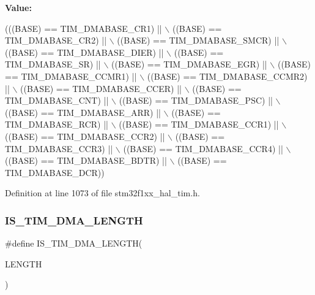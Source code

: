 {\bfseries Value\+:}
\begin{DoxyCode}
(((BASE) == TIM\_DMABASE\_CR1)   || \(\backslash\)
                               ((BASE) == TIM\_DMABASE\_CR2)   || \(\backslash\)
                               ((BASE) == TIM\_DMABASE\_SMCR)  || \(\backslash\)
                               ((BASE) == TIM\_DMABASE\_DIER)  || \(\backslash\)
                               ((BASE) == TIM\_DMABASE\_SR)    || \(\backslash\)
                               ((BASE) == TIM\_DMABASE\_EGR)   || \(\backslash\)
                               ((BASE) == TIM\_DMABASE\_CCMR1) || \(\backslash\)
                               ((BASE) == TIM\_DMABASE\_CCMR2) || \(\backslash\)
                               ((BASE) == TIM\_DMABASE\_CCER)  || \(\backslash\)
                               ((BASE) == TIM\_DMABASE\_CNT)   || \(\backslash\)
                               ((BASE) == TIM\_DMABASE\_PSC)   || \(\backslash\)
                               ((BASE) == TIM\_DMABASE\_ARR)   || \(\backslash\)
                               ((BASE) == TIM\_DMABASE\_RCR)   || \(\backslash\)
                               ((BASE) == TIM\_DMABASE\_CCR1)  || \(\backslash\)
                               ((BASE) == TIM\_DMABASE\_CCR2)  || \(\backslash\)
                               ((BASE) == TIM\_DMABASE\_CCR3)  || \(\backslash\)
                               ((BASE) == TIM\_DMABASE\_CCR4)  || \(\backslash\)
                               ((BASE) == TIM\_DMABASE\_BDTR)  || \(\backslash\)
                               ((BASE) == TIM\_DMABASE\_DCR))
\end{DoxyCode}


Definition at line 1073 of file stm32f1xx\+\_\+hal\+\_\+tim.\+h.

\mbox{\label{group___t_i_m___private___macros_gafd09cf0887b01a15101ba7dd6e2b4ba7}} 
\subsubsection{\texorpdfstring{I\+S\+\_\+\+T\+I\+M\+\_\+\+D\+M\+A\+\_\+\+L\+E\+N\+G\+TH}{IS\_TIM\_DMA\_LENGTH}}
{\footnotesize\ttfamily \#define I\+S\+\_\+\+T\+I\+M\+\_\+\+D\+M\+A\+\_\+\+L\+E\+N\+G\+TH(\begin{DoxyParamCaption}\item[{}]{L\+E\+N\+G\+TH }\end{DoxyParamCaption})}

